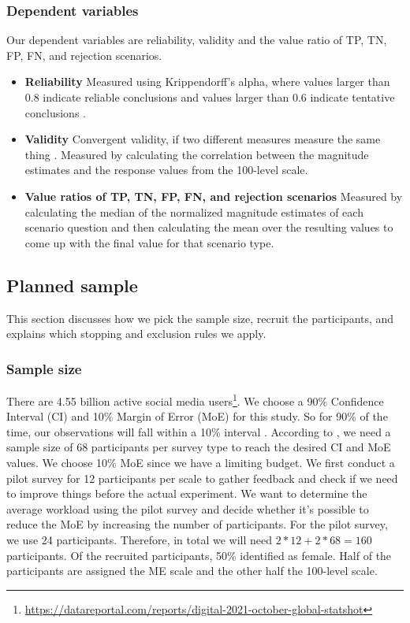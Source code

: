\subsubsection{Dependent variables}
Our dependent variables are reliability, validity and the value ratio of TP, TN, FP, FN, and rejection scenarios.
%
\begin{itemize}
    \item \textbf{Reliability} Measured using Krippendorff's alpha, where values larger than 0.8 indicate reliable conclusions and values larger than 0.6 indicate tentative conclusions \cite{krippendorff2004reliability}.
    \item \textbf{Validity} Convergent validity, if two different measures measure the same thing \cite{fitzner2007reliability}. Measured by calculating the correlation between the magnitude estimates and the response values from the 100-level scale.
    \item \textbf{Value ratios of TP, TN, FP, FN, and rejection scenarios} Measured by calculating the median of the normalized magnitude estimates of each scenario question and then calculating the mean over the resulting values to come up with the final value for that scenario type.
\end{itemize}

\subsection{Planned sample}
This section discusses how we pick the sample size, recruit the participants, and explains which stopping and exclusion rules we apply.

\subsubsection{Sample size}
There are 4.55 billion active social media users\footnote{\url{https://datareportal.com/reports/digital-2021-october-global-statshot}}.
%
We choose a 90\% Confidence Interval (CI) and 10\% Margin of Error (MoE) for this study.
%
So for 90\% of the time, our observations will fall within a 10\% interval \cite{olson2014ways}.
%
According to \cite{olson2014ways}, we need a sample size of 68 participants per survey type to reach the desired CI and MoE values.
%
We choose 10\% MoE since we have a limiting budget.
%
We first conduct a pilot survey for 12 participants per scale to gather feedback and check if we need to improve things before the actual experiment.
%
We want to determine the average workload using the pilot survey and decide whether it's possible to reduce the MoE by increasing the number of participants.
%
For the pilot survey, we use 24 participants.
%
Therefore, in total we will need $2*12+2*68 = 160$ participants.
%
Of the recruited participants, 50\% identified as female.
%
Half of the participants are assigned the ME scale and the other half the 100-level scale.


